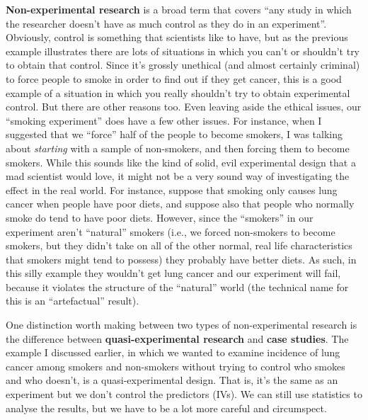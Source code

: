 \documentclass[
  letterpaper,
]{book}
\begin{document}
\textbf{Non-experimental research} is a broad term that covers ``any
study in which the researcher doesn't have as much control as they do in
an experiment''. Obviously, control is something that scientists like to
have, but as the previous example illustrates there are lots of
situations in which you can't or shouldn't try to obtain that control.
Since it's grossly unethical (and almost certainly criminal) to force
people to smoke in order to find out if they get cancer, this is a good
example of a situation in which you really shouldn't try to obtain
experimental control. But there are other reasons too. Even leaving
aside the ethical issues, our ``smoking experiment'' does have a few
other issues. For instance, when I suggested that we ``force'' half of
the people to become smokers, I was talking about \emph{starting} with a
sample of non-smokers, and then forcing them to become smokers. While
this sounds like the kind of solid, evil experimental design that a mad
scientist would love, it might not be a very sound way of investigating
the effect in the real world. For instance, suppose that smoking only
causes lung cancer when people have poor diets, and suppose also that
people who normally smoke do tend to have poor diets. However, since the
``smokers'' in our experiment aren't ``natural'' smokers (i.e., we
forced non-smokers to become smokers, but they didn't take on all of the
other normal, real life characteristics that smokers might tend to
possess) they probably have better diets. As such, in this silly example
they wouldn't get lung cancer and our experiment will fail, because it
violates the structure of the ``natural'' world (the technical name for
this is an ``artefactual'' result).

One distinction worth making between two types of non-experimental
research is the difference between \textbf{quasi-experimental research}
and \textbf{case studies}. The example I discussed earlier, in which we
wanted to examine incidence of lung cancer among smokers and non-smokers
without trying to control who smokes and who doesn't, is a
quasi-experimental design. That is, it's the same as an experiment but
we don't control the predictors (IVs). We can still use statistics to
analyse the results, but we have to be a lot more careful and
circumspect.
\end{document}
